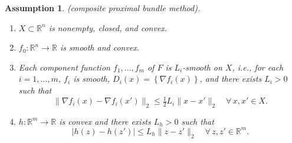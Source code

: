 \documentclass[10pt,a4paper]{amsart}
\newtheorem{assumption}{Assumption}
\renewcommand{\Re}{\mathbb{R}}
\newcommand{\col}[1]{\left\{#1\right\}}
\newcommand{\fc}[2]{: #1 \rightarrow #2}
\begin{document}
\begin{assumption}{\rm (composite proximal bundle method).}\label{assumptions}
\mbox{ }
\begin{enumerate}[label=(\alph*), start=1]
\item $X\subset \Re^n$ is nonempty, closed, and convex.
\item $f_0\fc{\Re^n}{\Re}$ is smooth and convex.
\item Each component function $f_1, \dots, f_m$ of $F$ is $L_i$-smooth on $X$, i.e., for each $i=1, \dots, m$, $f_i$ is smooth, $D_i(x)=\col{\nabla f_i(x)}$, and there exists $L_i>0$ such that
\[
\big\|\nabla f_i(x)-\nabla f_i(x')\big\|_2 \leq \tfrac{1}{2}L_i \|x-x'\|_2\quad \forall\, x,x'\in X.
\]

\item $h\fc{\Re^m}{\Re}$ is convex and there exists $L_h>0$ such that
\[
\big|h(z)-h(z')\big|\leq {L_h}\|z-z'\|_2\quad \forall\, z,z'\in \Re^m.
\]

\end{enumerate}
\end{assumption}
\end{document}
